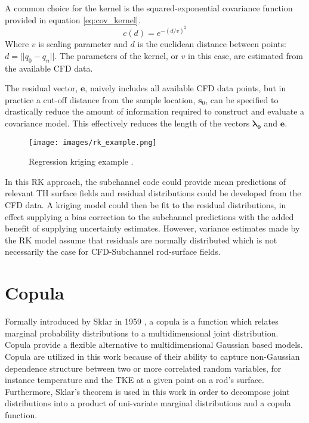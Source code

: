 A common choice for the kernel is the squared-exponential covariance function provided in equation \ref{eq:cov_kernel}.
\begin{equation}
c(d) = e^{-(d/v)^2}
\label{eq:cov_kernel}
\end{equation}
Where $v$ is scaling parameter and $d$ is the euclidean distance between points: $d=||q_0 - q_n||$.
The parameters of the kernel, or $v$ in this case, are estimated from the available CFD data.

The residual vector, $\mathbf e$, naively includes all available CFD data points, but in practice a cut-off distance from the sample location, $\mathbf s_0$, can be specified to drastically reduce the amount of information required to construct and evaluate a covariance model.  This effectively reduces the length of the vectors $\mathbf{\lambda_0}$ and $\mathbf e$.

\begin{figure}[hbtp]
	\centering
	\texttt{[image: images/rk\_example.png]}
	\caption[Regression kriging example.]{Regression kriging example \cite{Hengl07}.}
	\label{fit:rk}
\end{figure}

In this RK approach, the subchannel code could provide mean predictions of relevant TH surface fields and residual distributions could be developed from the CFD data.  A kriging model could then be fit to the residual distributions, in effect supplying a bias correction to the subchannel predictions with the added benefit of supplying uncertainty estimates.  However, variance estimates made by the RK model assume that residuals are normally distributed which is not necessarily the case for CFD-Subchannel rod-surface fields.


\section{Copula}

Formally introduced by Sklar in 1959 \cite{Sklar1959}, a copula is a function which relates marginal probability distributions to a multidimensional joint distribution.  Copula provide a flexible alternative to multidimensional Gaussian based models.  Copula are utilized in this work because of their ability to capture non-Gaussian dependence structure between two or more correlated random variables, for instance temperature and the TKE at a given point on a rod's surface.  Furthermore, Sklar's theorem is used in this work in order to decompose joint distributions into a product of uni-variate marginal distributions and a copula function.  

